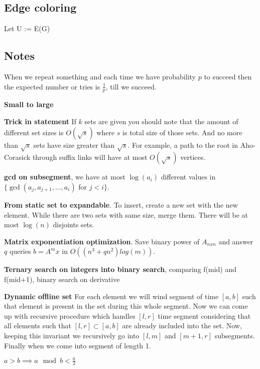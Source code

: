 \documentclass[a4paper,10pt,oneside]{article}
\begin{document}
\begin{multicols}{2}
\subsection{Edge coloring}

\begin{algorithm}[H]
\SetAlgoLined
{}
Let U := E(G)\;
\end{algorithm}

\subsection{Notes}
When we repeat something and each time we have probability $p$ to succeed then the expected number or tries is $\frac{1}{p}$, till we succeed.

\textbf{Small to large}

\textbf{Trick in statement} If $k$ sets are given you should note that the amount of different set sizes is $O(\sqrt{s})$ where $s$ is total size of those sets. And no more than $\sqrt{s}$ sets have size greater than $\sqrt{s}$. For example, a path to the root in Aho-Corasick through suffix links will have at most $O(\sqrt{s})$ vertices.

\textbf{gcd on subsegment}, we have at most $\log(a_i)$ different values in $\{\gcd(a_j, a_{j+1}, ..., a_i)$ for $j < i\}$.

\textbf{From static set to expandable}. To insert, create a new set with the new element. While there are two sets with same size, merge them. There will be at most $\log(n)$ disjoints sets.

\textbf{Matrix exponentiation optimization}. Save binary power of $A_{nxn}$ and answer $q$ queries $b = A^mx$ in $O((n^3 + qn^2)log(m))$.

\textbf{Ternary search on integers into binary search}, comparing f(mid) and f(mid+1), binary search on derivative

\textbf{Dynamic offline set} For each element we will wind segment of time $[a, b]$ such that element is present in the set during this whole segment. Now we can come up with recursive procedure which handles $[l, r]$ time segment considering that all elements such that $[l, r] \subset [a, b]$ are already included into the set. Now, keeping this invariant we recursively go into $[l, m]$ and $[m+1, r]$ subsegments. Finally when we come into segment of length 1.

$a > b \implies a \mod b < \frac{a}{2}$

\end{multicols}
\end{document}

